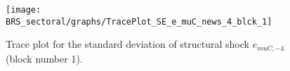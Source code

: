 \begin{figure}[H]
\centering
  \texttt{[image: BRS\_sectoral/graphs/TracePlot\_SE\_e\_muC\_news\_4\_blck\_1]}\\
    \caption{Trace plot for the standard deviation of structural shock ${e_{muC,-4}}$ (block number 1).}
\end{figure}
